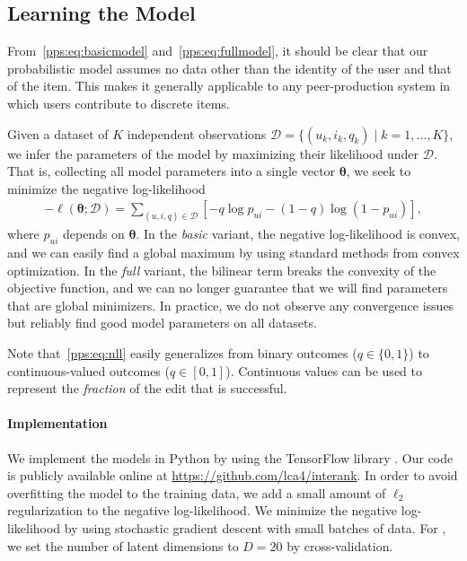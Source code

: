 \subsection{Learning the Model}
\label{pps:sec:learning}

From~\eqref{pps:eq:basicmodel} and~\eqref{pps:eq:fullmodel}, it should be clear that our probabilistic model assumes no data other than the identity of the user and that of the item.
This makes it generally applicable to any peer-production system in which users contribute to discrete items.

Given a dataset of $K$ independent observations $\mathcal{D} = \{ (u_k, i_k, q_k) \mid k = 1, \ldots, K \}$, we infer the parameters of the model by maximizing their likelihood under $\mathcal{D}$.
That is, collecting all model parameters into a single vector $\bm{\theta}$, we seek to minimize the negative log-likelihood
\begin{align}
	\label{pps:eq:nll}
	- \ell (\bm{\theta} ; \mathcal{D}) = \sum_{(u,i,q) \in \mathcal{D}} \left[ -q \log p_{ui} - (1 - q) \log (1 - p_{ui}) \right],
\end{align}
where $p_{ui}$ depends on $\bm{\theta}$.
In the \emph{basic} variant, the negative log-likelihood is convex, and we can easily find a global maximum by using standard methods from convex optimization.
In the \emph{full} variant, the bilinear term breaks the convexity of the objective function, and we can no longer guarantee that we will find parameters that are global minimizers.
In practice, we do not observe any convergence issues but reliably find good model parameters on all datasets.

Note that~\eqref{pps:eq:nll} easily generalizes from binary outcomes ($q \in \{0, 1\}$) to continuous-valued outcomes ($q \in [0, 1]$).
Continuous values can be used to represent the \emph{fraction} of the edit that is successful.

\paragraph{Implementation}
We implement the models in Python by using the TensorFlow library \citep{abadi2016tensorflow}.
Our code is publicly available online at \url{https://github.com/lca4/interank}.
In order to avoid overfitting the model to the training data, we add a small amount of $\ell_2$ regularization to the negative log-likelihood.
We minimize the negative log-likelihood by using stochastic gradient descent \citep{bishop2006pattern} with small batches of data.
For , we set the number of latent dimensions to $D = 20$ by cross-validation.

